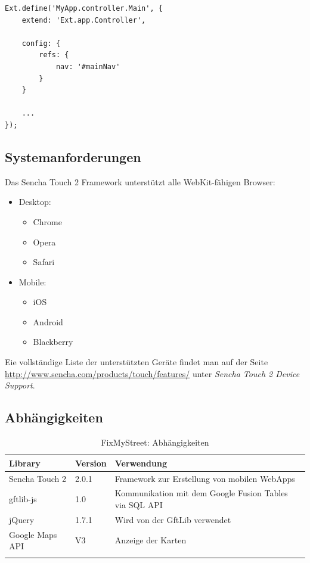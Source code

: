 \lstset{language=JavaScript}
\begin{lstlisting}[caption=Beispiel eines Component-Queries in Sencha Touch 2, label=st2-componentquery]
Ext.define('MyApp.controller.Main', {
	extend: 'Ext.app.Controller',
	
	config: {
		refs: {
			nav: '#mainNav'
		}
	}
	
	...
});
\end{lstlisting}

\subsection{Systemanforderungen}
Das Sencha Touch 2 Framework unterstützt alle WebKit-fähigen Browser:

\begin{itemize}
\item Desktop:
\begin{itemize}
	\item Chrome
	\item Opera
	\item Safari
\end{itemize}

\item Mobile:
\begin{itemize}
	\item iOS
	\item Android
	\item Blackberry
\end{itemize}
\end{itemize}

Eie vollständige Liste der unterstützten Geräte findet man auf der Seite \url{http://www.sencha.com/products/touch/features/} unter \emph{Sencha Touch 2 Device Support}.

\subsection{Abhängigkeiten}
\begin{longtable}{|p{0.25\threecelltabwidth}|p{0.1\threecelltabwidth}|p{0.65\threecelltabwidth}|}
\hline 
\textbf{Library} & \textbf{Version} & \textbf{Verwendung} \\ 
\hline 
Sencha Touch 2 & 2.0.1 & Framework zur Erstellung von mobilen \gls{WebApp}s \\ 
\hline 
gftlib-js & 1.0 & Kommunikation mit dem Google Fusion Tables via SQL \gls{API} \\ 
\hline 
jQuery & 1.7.1 & Wird von der GftLib verwendet \\ 
\hline 
Google Maps \gls{API} & V3 & Anzeige der Karten \\ 
\hline 
\caption{FixMyStreet: Abhängigkeiten}
\end{longtable} 

